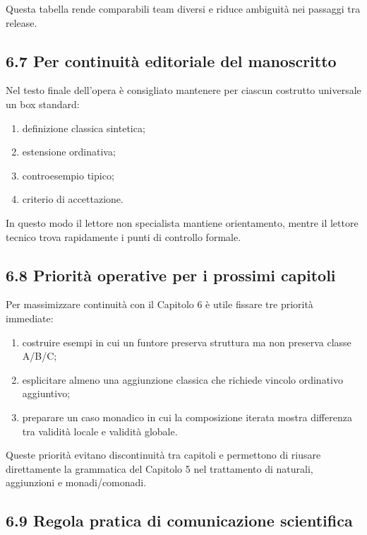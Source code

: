 Questa tabella rende comparabili team diversi e riduce ambiguità nei passaggi tra release.

\subsection{6.7 Per continuità editoriale del manoscritto}

Nel testo finale dell'opera è consigliato mantenere per ciascun costrutto universale un box standard:

\begin{enumerate}
\def\labelenumi{\arabic{enumi}.}
\tightlist
\item
  definizione classica sintetica;
\item
  estensione ordinativa;
\item
  controesempio tipico;
\item
  criterio di accettazione.
\end{enumerate}

In questo modo il lettore non specialista mantiene orientamento, mentre il lettore tecnico trova rapidamente i punti di controllo formale.

\subsection{6.8 Priorità operative per i prossimi capitoli}

Per massimizzare continuità con il Capitolo 6 è utile fissare tre priorità immediate:

\begin{enumerate}
\def\labelenumi{\arabic{enumi}.}
\tightlist
\item
  costruire esempi in cui un funtore preserva struttura ma non preserva classe A/B/C;
\item
  esplicitare almeno una aggiunzione classica che richiede vincolo ordinativo aggiuntivo;
\item
  preparare un caso monadico in cui la composizione iterata mostra differenza tra validità locale e validità globale.
\end{enumerate}

Queste priorità evitano discontinuità tra capitoli e permettono di riusare direttamente la grammatica del Capitolo 5 nel trattamento di naturali, aggiunzioni e monadi/comonadi.

\subsection{6.9 Regola pratica di comunicazione scientifica}

